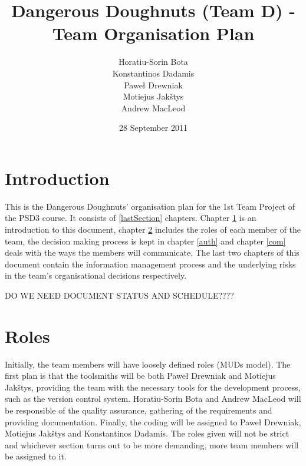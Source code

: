 \documentclass{article}
\begin{document}
\title{Dangerous Doughnuts (Team D) - Team Organisation Plan} %
\author{Horatiu-Sorin Bota \\
		Konstantinos Dadamis \\
		Paweł Drewniak \\
		Motiejus Jakštys \\
		Andrew MacLeod} %

\date{28 September 2011}
\maketitle

\section{Introduction}
\label{intro}

This is the Dangerous Doughnuts' organisation plan for the 1st Team
Project of the PSD3 course. It consists of \ref{lastSection}
chapters. Chapter \ref{intro} is an introduction to this document,
chapter \ref{role} includes the roles of each member of the team, the decision making process is kept in chapter \ref{auth} and chapter \ref{com} deals with the ways the members will communicate. The last two chapters of this document contain the information management process and the underlying risks in the team's organisational decisions respectively.

DO WE NEED DOCUMENT STATUS AND SCHEDULE????


\section{Roles}
\label{role}

Initially, the team members will have loosely defined roles (MUDs model). The first plan is that the toolsmiths will be both Paweł Drewniak and Motiejus Jakštys, providing the team with the necessary tools for the development process, such as the version control system. Horatiu-Sorin Bota and Andrew MacLeod will be responsible of the quality assurance, gathering of the requirements and providing documentation. Finally, the coding will be assigned to Paweł Drewniak, Motiejus Jakštys and Konstantinos Dadamis. The roles given will not be strict and whichever section turns out to be more demanding, more team members will be assigned to it.  
\end{document}
